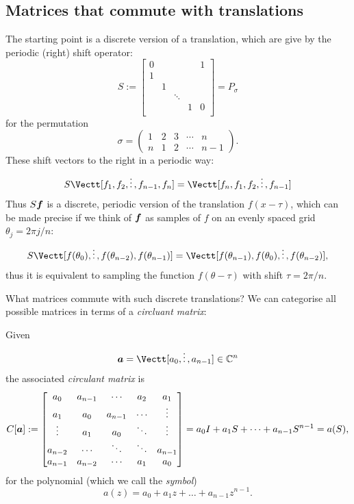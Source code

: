 \subsection{Matrices that commute with translations}
The starting point is a discrete version of a translation, which are give by the periodic (right) shift operator:
\[
S := \begin{bmatrix}
0 & & & &  1\\
 1 \\
& 1 \\
&& \ensuremath{\ddots} \\
&&& 1 & 0 \\
\end{bmatrix} = P_\ensuremath{\sigma}
\]
for the permutation
\[
\ensuremath{\sigma} = \begin{pmatrix}1 & 2 & 3 & \ensuremath{\cdots}  & n \\
n & 1 & 2 & \ensuremath{\cdots}  & n-1 \end{pmatrix}.
\]
These shift vectors to the right in a periodic way:
\[
S \Vectt[f_1,f_2,\dots, f_{n-1},f_n] = \Vectt[f_n,f_1,f_2,\dots,f_{n-1}]
\]
Thus $S \bm{{\mbox{\boldmath$f$\unboldmath}}}$ is a discrete, periodic version of the translation $f(x-\ensuremath{\tau})$, which can be made precise if we think of $\bm{{\mbox{\boldmath$f$\unboldmath}}}$ as samples of $f$ on an evenly spaced grid $\ensuremath{\theta}_j = 2\ensuremath{\pi}j/n$:
\[
S \Vectt[f(\ensuremath{\theta}_0),\dots,f(\ensuremath{\theta}_{n-2}), f(\ensuremath{\theta}_{n-1})] = \Vectt[f(\ensuremath{\theta}_{n-1}), f(\ensuremath{\theta}_0),\dots,f(\ensuremath{\theta}_{n-2})],
\]
thus it is equivalent to sampling the function $f(\ensuremath{\theta}-\ensuremath{\tau})$ with shift $\ensuremath{\tau} = 2\ensuremath{\pi}/n$.

What matrices commute with such discrete translations? We can categorise all possible matrices in terms of a \emph{circluant matrix}:

\begin{definition} Given 
\[
\ensuremath{\bm{\a}} = \Vectt[a_0,\ensuremath{\vdots},a_{n-1}] \ensuremath{\in} \ensuremath{\bbC}^n
\]
the associated \emph{circulant matrix} is 
\[
C[\ensuremath{\bm{\a}}] := \begin{bmatrix}
a_0 & a_{n-1} & \ensuremath{\cdots} & a_2 & a_1 \\ 
a_1 & a_0 & a_{n-1}&  \ensuremath{\cdots} & \ensuremath{\vdots} \\
\ensuremath{\vdots} &  a_1 & a_0 & \ensuremath{\ddots} &  \ensuremath{\vdots}  \\
a_{n-2}  & \ensuremath{\cdots} & \ensuremath{\ddots} & \ensuremath{\ddots} & a_{n-1} \\
a_{n-1} & a_{n-2} & \ensuremath{\cdots} & a_1 & a_0
\end{bmatrix}  = a_0I + a_1S + \ensuremath{\cdots} + a_{n-1} S^{n-1} = a(S),
\]
for the polynomial (which we call the \emph{symbol})
\[
a(z) = a_0 + a_1 z + \ensuremath{\ldots} + a_{n-1} z^{n-1}.
\]
\end{definition}

